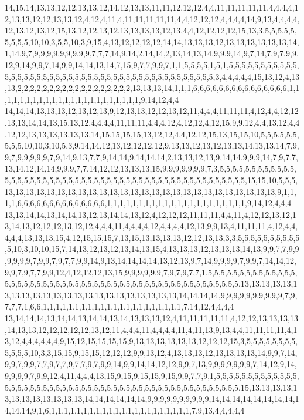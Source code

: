 14,15,14,13,13,12,12,13,13,12,14,12,13,13,11,11,12,12,12,4,4,11,11,11,11,11,4,4,4,4,12,13,13,12,12,13,13,12,4,12,4,11,4,11,11,11,11,11,4,4,12,12,12,4,4,4,4,14,9,13,4,4,4,4,12,13,12,13,12,15,13,12,12,13,12,13,13,13,13,12,13,4,4,12,12,12,12,15,13,3,5,5,5,5,5,5,5,5,5,10,10,3,5,5,10,3,9,15,4,13,12,12,12,12,14,14,13,13,13,12,13,13,13,13,13,13,14,1,14,9,7,9,9,9,9,9,9,9,9,9,7,7,7,14,9,14,2,14,14,2,13,14,13,14,9,9,9,14,9,7,14,7,9,7,9,9,12,9,14,9,9,7,14,9,9,14,14,13,14,7,15,9,7,7,9,9,7,1,1,5,5,5,5,1,5,1,5,5,5,5,5,5,5,5,5,5,5,5,5,5,5,5,5,5,5,5,5,5,5,5,5,5,5,5,5,5,5,5,5,5,5,5,5,5,5,5,5,5,5,5,3,4,4,4,4,4,15,13,12,4,13,13,2,2,2,2,2,2,2,2,2,2,2,2,2,2,2,2,2,2,13,13,13,14,1,1,1,6,6,6,6,6,6,6,6,6,6,6,6,6,6,6,1,1,1,1,1,1,1,1,1,1,1,1,1,1,1,1,1,1,1,1,1,1,1,9,14,12,4,4
14,14,14,13,13,13,12,13,12,13,9,12,13,13,12,12,13,12,11,4,4,4,11,11,11,4,12,4,4,12,12,13,13,14,14,13,15,13,12,4,4,4,4,11,11,11,4,4,4,12,4,12,12,4,12,15,9,9,12,4,4,13,12,4,4,12,12,13,13,13,13,13,13,14,15,15,15,15,13,12,12,4,4,12,12,15,13,15,15,10,5,5,5,5,5,5,5,5,5,10,10,3,10,5,3,9,14,14,12,13,12,12,12,12,9,13,13,12,13,12,13,13,14,13,13,14,7,9,9,7,9,9,9,9,9,7,9,14,9,13,7,7,9,14,14,9,14,14,14,2,13,13,12,13,9,14,14,9,9,9,14,7,9,7,7,13,14,12,14,14,9,9,9,7,7,14,12,12,13,13,13,15,9,9,9,9,9,9,9,7,3,5,5,5,5,5,5,5,5,5,5,5,5,5,5,5,5,5,5,5,5,5,5,5,5,5,5,5,5,5,5,5,5,5,5,5,5,5,5,5,5,5,5,5,5,5,5,5,5,5,5,15,15,10,5,5,5,13,13,13,13,13,13,13,13,13,13,13,13,13,13,13,13,13,13,13,13,13,13,13,13,13,13,9,1,1,1,1,6,6,6,6,6,6,6,6,6,6,6,6,6,6,1,1,1,1,1,1,1,1,1,1,1,1,1,1,1,1,1,1,1,1,1,1,9,14,12,4,4,4
13,13,14,14,13,14,14,13,12,13,14,14,13,12,4,12,12,12,11,11,11,4,4,11,4,12,12,13,12,13,14,13,12,12,12,13,12,12,4,4,4,11,4,4,4,4,12,4,4,4,4,12,13,9,9,13,4,11,11,11,4,12,4,4,4,4,4,13,13,13,15,4,12,15,15,15,7,13,15,13,13,13,13,12,12,13,13,3,3,5,5,5,5,5,5,5,5,5,5,5,10,3,10,10,15,7,14,13,12,13,12,13,14,13,15,4,13,13,13,12,13,13,13,14,13,9,9,7,7,9,9,9,9,9,9,7,9,9,7,9,7,7,9,9,14,9,13,14,14,14,14,13,12,13,9,7,14,9,9,9,9,7,9,9,7,14,14,12,9,9,7,9,7,7,9,9,12,4,12,12,12,13,15,9,9,9,9,9,9,7,9,7,9,7,7,1,5,5,5,5,5,5,5,5,5,5,5,5,5,5,5,5,5,5,5,5,5,5,5,5,5,5,5,5,5,5,5,5,5,5,5,5,5,5,5,5,5,5,5,5,5,5,5,5,5,5,5,13,13,13,13,13,13,13,13,13,13,13,13,13,13,13,13,13,13,13,13,13,13,14,14,14,14,9,9,9,9,9,9,9,9,9,9,7,9,7,7,7,1,6,6,1,1,1,1,1,1,1,1,1,1,1,1,1,1,1,1,1,1,1,1,1,1,7,14,12,4,4,4,4
13,14,14,14,13,14,14,13,14,14,13,14,13,13,13,12,4,11,11,11,11,11,4,12,12,13,13,13,13,14,13,13,12,12,12,12,12,13,12,11,4,4,4,11,4,4,4,4,11,4,11,13,9,13,4,4,11,11,11,11,4,13,12,4,4,4,4,4,4,9,15,12,15,15,15,15,9,13,13,13,13,13,13,12,12,12,15,3,5,5,5,5,5,5,5,5,5,5,5,5,10,3,3,15,15,9,15,15,12,12,12,9,9,13,12,4,13,13,13,12,13,13,13,13,14,9,9,7,14,9,9,7,9,9,7,7,9,7,7,9,7,7,9,7,9,9,14,9,9,14,14,12,12,9,9,7,13,9,9,9,9,9,9,9,7,14,12,9,14,9,9,9,9,7,9,9,12,4,11,4,4,4,13,15,9,15,9,15,15,9,15,9,9,7,7,9,1,5,5,5,5,5,5,5,5,5,5,5,5,5,5,5,5,5,5,5,5,5,5,5,5,5,5,5,5,5,5,5,5,5,5,5,5,5,5,5,5,5,5,5,5,5,5,5,5,5,5,15,13,13,13,13,13,13,13,13,13,13,13,13,14,14,14,14,14,14,9,9,9,9,9,9,9,9,9,9,14,14,14,14,14,14,14,14,14,14,14,9,1,6,1,1,1,1,1,1,1,1,1,1,1,1,1,1,1,1,1,1,1,1,1,1,7,9,13,4,4,4,4,4
